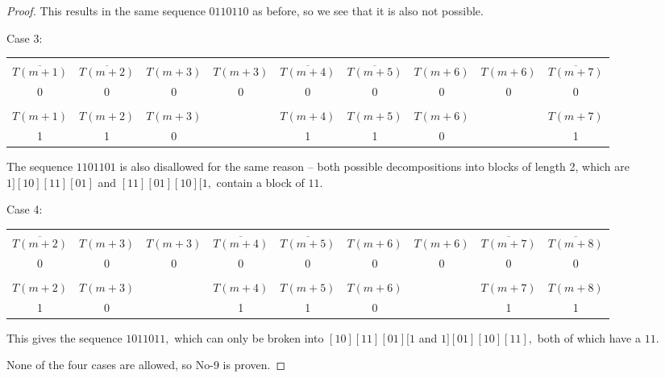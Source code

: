\documentclass{article}
\begin{document}
\begin{proof}
This results in the same sequence $0110110$ as before, so we see that it is also not possible.

Case 3:

\begin{center}
\begin{tabular}{ |c|c|c|c|c|c|c|c|c| } 
 \hline
&&&&&&&&\\
$\overline{T(m+1)}$ & $\overline{T(m+2)}$ & $T(m+3)$ & $T(m+3)$ & $\overline{T(m+4)}$ & $\overline{T(m+5)}$ & $T(m+6)$ & $T(m+6)$ & $\overline{T(m+7)}$ \\ 
0 & 0 & 0 & 0 & 0 & 0 & 0 & 0 & 0 \\
\hline
&&&&&&&&\\
$T(m+1)$ & $T(m+2)$ & $T(m+3)$ & & $T(m+4)$ & $T(m+5)$ & $T(m+6)$ & & $T(m+7)$ \\
1 & 1 & 0 & & 1 & 1 & 0 & & 1 \\
 \hline
\end{tabular}
\end{center}

The sequence $1101101$ is also disallowed for the same reason -- both possible decompositions into blocks of length 2, which are $1][10][11][01]$ and $[11][01][10][1,$ contain a block of $11.$

Case 4:

\begin{center}
\begin{tabular}{ |c|c|c|c|c|c|c|c|c| } 
 \hline
&&&&&&&&\\
 $\overline{T(m+2)}$ & $T(m+3)$ & $T(m+3)$ & $\overline{T(m+4)}$ & $\overline{T(m+5)}$ & $T(m+6)$ & $T(m+6)$ & $\overline{T(m+7)}$ & $\overline{T(m+8)}$ \\ 
0 & 0 & 0 & 0 & 0 & 0 & 0 & 0 & 0 \\
\hline
&&&&&&&&\\
$T(m+2)$ & $T(m+3)$ & & $T(m+4)$ & $T(m+5)$ & $T(m+6)$ & & $T(m+7)$ & $T(m+8)$ \\
1 & 0 & & 1 & 1 & 0 & & 1 & 1 \\
 \hline
\end{tabular}
\end{center}

This gives the sequence $1011011,$ which can only be broken into $[10][11][01][1$ and $1][01][10][11],$ both of which have a $11.$

None of the four cases are allowed, so No-9 is proven.
\end{proof}
\end{document}
